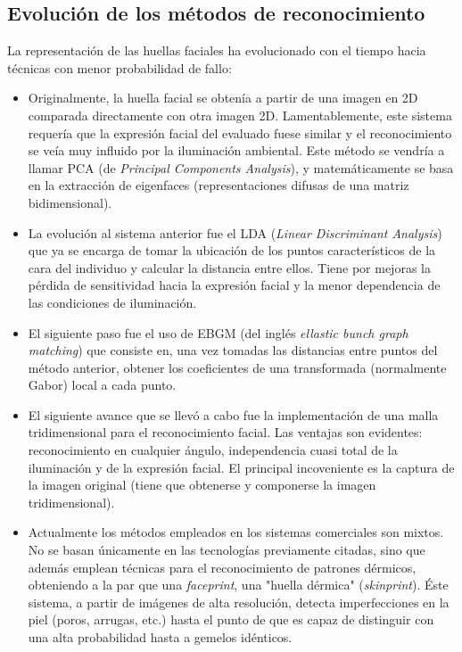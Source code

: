\subsection{Evolución de los métodos de reconocimiento}
La representación de las huellas faciales ha evolucionado con el tiempo hacia técnicas con menor probabilidad de fallo:
\begin{itemize}
	\item{Originalmente, la huella facial se obtenía a partir de una imagen en 2D comparada directamente con otra imagen 2D. Lamentablemente, este sistema requería que la expresión facial del evaluado fuese similar y el reconocimiento se veía muy influido por la iluminación ambiental. Este método se vendría a llamar PCA (de \textit{Principal Components Analysis}), y matemáticamente se basa en la extracción de eigenfaces (representaciones difusas de una matriz bidimensional). }
	\item{La evolución al sistema anterior fue el LDA (\textit{Linear Discriminant Analysis}) que ya se encarga de tomar la ubicación de los puntos característicos de la cara del individuo y calcular la distancia entre ellos. Tiene por mejoras la pérdida de sensitividad hacia la expresión facial y la menor dependencia de las condiciones de iluminación.}
	\item{El siguiente paso fue el uso de EBGM (del inglés \textit{ellastic bunch graph matching}) que consiste en, una vez tomadas las distancias entre puntos del método anterior, obtener los coeficientes de una transformada (normalmente Gabor) local a cada punto.}
	\item{El siguiente avance que se llevó a cabo fue la implementación de una malla tridimensional para el reconocimiento facial. Las ventajas son evidentes: reconocimiento en cualquier ángulo, independencia cuasi total de la iluminación y de la expresión facial. El principal incoveniente es la captura de la imagen original (tiene que obtenerse y componerse la imagen tridimensional).}
	\item{Actualmente los métodos empleados en los sistemas comerciales son mixtos. No se basan únicamente en las tecnologías previamente citadas, sino que además emplean técnicas para el reconocimiento de patrones dérmicos, obteniendo a la par que una \textit{faceprint}, una "huella dérmica" (\textit{skinprint}). Éste sistema, a partir de imágenes de alta resolución, detecta imperfecciones en la piel (poros, arrugas, etc.) hasta el punto de que es capaz de distinguir con una alta probabilidad hasta a gemelos idénticos.}
\end{itemize}

